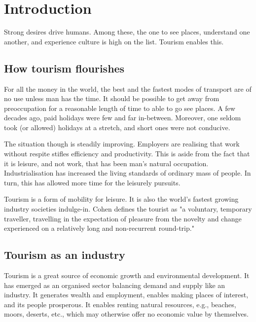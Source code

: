 \chapter{Introduction} %
\label{cha:intro}

Strong desires drive humans. Among these, the one to see places, understand one another, and experience culture is high on the list. Tourism enables this.

\section{How tourism flourishes} %
\label{sec:htf}

For all the money in the world, the best and the fastest modes of transport are of no use unless man has the time. It should be possible to get away from preoccupation for a reasonable length of time to able to go see places. A few decades ago, paid holidays were few and far in-between. Moreover, one seldom took (or allowed) holidays at a stretch, and short ones were not conducive.

The situation though is steadily improving. Employers are realising that work without respite stifles efficiency and productivity. This is aside from the fact that it is leisure, and not work, that has been man's natural occupation. Industrialisation has increased the living standards of ordinary mass of people. In turn, this has allowed more time for the leisurely pursuits.

Tourism is a form of mobility for leisure. It is also the world's fastest growing industry societies indulge-in. Cohen defines the tourist as "a voluntary, temporary traveller, travelling in the expectation of pleasure from the novelty and change experienced on a relatively long and non-recurrent round-trip."


\section{Tourism as an industry} %
\label{sec:tai}

Tourism is a great source of economic growth and environmental development. It has emerged as an organised sector balancing demand and supply like an industry. It generates wealth and employment, enables making places of interest, and its people prosperous. It enables renting natural resources, e.g., beaches, moors, deserts, etc., which may otherwise offer no economic value by themselves.

